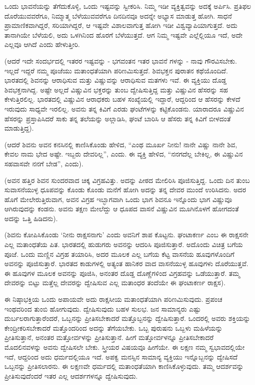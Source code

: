ಒಂದು ಭಾವನೆಯನ್ನು ತೆಗೆದುಕೊಳ್ಳಿ, ಒಂದು ಇಷ್ಟವನ್ನು ಸ್ವೀಕರಿಸಿ. ನಿಮ್ಮ ಇಡೀ ವ್ಯಕ್ತಿತ್ವವನ್ನು ಅದಕ್ಕೆ ಅರ್ಪಿಸಿ. ಪ್ರತಿಫಲ ದೊರೆಯುವವರೆಗೂ, ನಿಮ್ಮಾತ್ಮ ಬೆಳೆಯುವವರೆಗೂ ದಿನದಿನವೂ ಅದನ್ನೇ ಅಭ್ಯಾಸ ಮಾಡುತ್ತ ಹೋಗಿ. ಸಾಧನೆ ಪ್ರಾಮಾಣಿಕವಾಗಿದ್ದರೆ, ಸರಿಯಾಗಿದ್ದರೆ, ಆ ಇಷ್ಟವೇ ವಿಶಾಲವಾಗುತ್ತ ಹೋಗಿ ಇಡೀ ವಿಶ್ವವ್ಯಾಪಿಯಾಗುತ್ತದೆ. ಅದು ತಾನಾಗಿಯೇ ಬೆಳೆಯಲಿ, ಅದು ಒಳಗಿನಿಂದ ಹೊರಗೆ ಬೆಳೆಯುತ್ತದೆ. ಆಗ ನಿಮ್ಮ ಇಷ್ಟವೇ ಎಲ್ಲೆಲ್ಲಿಯೂ ಇದೆ, ಅದೇ ಎಲ್ಲವೂ ಆಗಿದೆ ಎಂದು ಹೇಳುತ್ತೀರಿ.

(ಆದರೆ ಇದೇ ಸಂದರ್ಭದಲ್ಲಿ ಇತರರ ಇಷ್ಟವನ್ನು - ಭಗವಂತನ ಇತರ ಭಾವನೆ ಗಳನ್ನು - ನಾವು ಗೌರವಿಸಬೇಕು. ಇಲ್ಲದೆ ಇದ್ದರೆ ನಮ್ಮ ಪೂಜೆಯು ಮತಾಂಧತೆಯಾಗಿ ಪರಿಣಮಿಸುತ್ತದೆ. ಶಿವಭಕ್ತನ ಪುರಾತನ ಕಥೆಯೊಂದಿದೆ. ಭಾರತದಲ್ಲಿ ಶಿವನನ್ನು ಆರಾಧಿಸುವ ಮತ್ತು ವಿಷ್ಣುವನ್ನು ಆರಾಧಿಸುವ ಮತಗಳು ಇವೆ. ಈ ವ್ಯಕ್ತಿಯು ದೊಡ್ಡ ಶಿವಭಕ್ತನಾಗಿದ್ದ. ಅಷ್ಟೇ ಅಲ್ಲದೆ ವಿಷ್ಣುವಿನ ಭಕ್ತರನ್ನು ತುಂಬ ದ್ವೇಷಿಸುತ್ತಿದ್ದ ಮತ್ತು ವಿಷ್ಣುವಿನ ಹೆಸರನ್ನು ಸಹ ಕೇಳುತ್ತಿರಲಿಲ್ಲ. ಭಾರತದಲ್ಲಿ ವಿಷ್ಣುವಿನ ಆರಾಧಕರು ಬಹಳ ಸಂಖ್ಯೆಯಲ್ಲಿ ಇದ್ದಾರೆ, ಆದ್ದರಿಂದ ಆ ಹೆಸರನ್ನು ಕೇಳದೆ ಇರುವುದು ಸಾಧ್ಯವೇ ಇರಲಿಲ್ಲ. ಅವನು ತನ್ನ ಕಿವಿಗೆ ಎರಡು ಘಂಟೆಗಳನ್ನು ಕಟ್ಟಿಕೊಂಡನು. ಯಾರಾದರೂ ವಿಷ್ಣುವಿನ ಹೆಸರನ್ನು ಪ್ರಸ್ತಾಪಿಸಿದರೆ ಸಾಕು ತನ್ನ ತಲೆಯನ್ನು ಅಲ್ಲಾಡಿಸಿ, ಘಂಟೆ ಬಾರಿಸಿ ಆ ಹೆಸರು ತನ್ನ ಕಿವಿಗೆ ಬೀಳದಂತೆ ಮಾಡುತ್ತಿದ್ದ).

(ಆದರೆ ಶಿವನು ಅವನ ಕನಸಿನಲ್ಲಿ ಕಾಣಿಸಿಕೊಂಡು ಹೇಳಿದ, “ಎಂಥ ಮೂರ್ಖ ನೀನು! ನಾನೇ ವಿಷ್ಣು ನಾನೇ ಶಿವ, ಕೇವಲ ನಾಮ ಭೇದ ಅಷ್ಟೇ. ಇಬ್ಬರು ದೇವರಿಲ್ಲ”, ಎಂದು. ಈ ವ್ಯಕ್ತಿ ಹೇಳಿದ, “ನನಗದೆಲ್ಲ ಬೇಕಿಲ್ಲ, ಈ ವಿಷ್ಣುವಿನ ಸಹವಾಸವೇ ನನಗೆ ಬೇಡ”, ಎಂದು).

(ಅವನ ಹತ್ತಿರ ಶಿವನ ಸುಂದರವಾದ ಚಿಕ್ಕ ವಿಗ್ರಹವಿತ್ತು. ಅದನ್ನು ಪೀಠದ ಮೇಲಿರಿಸಿ ಪೂಜಿಸುತ್ತಿದ್ದ. ಒಂದು ದಿನ ತುಂಬ ಸುವಾಸನೆಯುಳ್ಳ ಧೂಪವನ್ನು ಕೊಂಡು ಕೊಂಡು ಮನೆಗೆ ಹೋಗಿ ಅದನ್ನು ತನ್ನ ದೇವರ ಮುಂದೆ ಉರಿಸಿದನು. ಅದರ ಹೊಗೆ ಮೇಲೇರುತ್ತಿರುವಾಗ, ಅವನ ವಿಗ್ರಹ ಇಬ್ಭಾಗವಾಗಿ ಒಂದು ಭಾಗ ಶಿವನೂ ಇನ್ನೊಂದು ಭಾಗ ವಿಷ್ಣುವೂ ಆಗಿರುವುದನ್ನು ಕಂಡನು. ಅವನು ತಕ್ಷಣ ಮೇಲೆದ್ದು ಆ ಧೂಪದ ವಾಸನೆ ವಿಷ್ಣುವಿನ ಮೂಗಿನೊಳಗೆ ಹೋಗದಂತೆ ಅದನ್ನು ಒತ್ತಿ ಹಿಡಿದನು).

(ಶಿವನು ಕೋಪಿಸಿಕೊಂಡು ‘ನೀನು ರಾಕ್ಷಸನಾಗು’ ಎಂದು ಅವನಿಗೆ ಶಾಪ ಕೊಟ್ಟನು. ಘಂಟಾಕರ್ಣ ಎಂಬ ಈ ರಾಕ್ಷಸನೇ ಎಲ್ಲ ಮತಾಂಧತೆಯ ಪಿತ. ಭಾರತದಲ್ಲಿ ಹುಡುಗರು ಅವನನ್ನು ಆದರಿಸಿ ಪೂಜಿಸುತ್ತಾರೆ. ಅದೊಂದು ವಿಚಿತ್ರ ಬಗೆಯ ಪೂಜೆ. ಒಂದು ಮಣ್ಣಿನ ವಿಗ್ರಹ ತಯಾರಿಸಿ, ಅದರ ಮೂಲಕ ಎಲ್ಲ ಬಗೆಯ ಕೆಟ್ಟ ವಾಸನೆಯ ಹೂವುಗಳೊಂದಿಗೆ ಅವನನ್ನು ಪೂಜಿಸುತ್ತಾರೆ. ಭಾರತದ ಕಾಡುಗಳಲ್ಲಿ ಅತ್ಯಂತ ಹಾನಿಕರ ವಾದ ವಾಸನೆಯುಳ್ಳ ಹೂವುಗಳು ದೊರೆಯುತ್ತವೆ. ಈ ಹೂವುಗಳ ಮೂಲಕ ಅವನನ್ನು ಪೂಜಿಸಿ, ಅನಂತರ ದೊಡ್ಡ ದೊಣ್ಣೆಗಳಿಂದ ವಿಗ್ರಹವನ್ನು ಒಡೆಯುತ್ತಾರೆ. ತಮ್ಮ ದೇವರನ್ನು ಬಿಟ್ಟು ಮತ್ತೆಲ್ಲ ದೇವರನ್ನು ದ್ವೇಷಿಸುವ ಎಲ್ಲ ಮತಾಂಧರ ತಂದೆಯೇ ಈ ಘಂಟಾಕರ್ಣ ರಾಕ್ಷಸ).

ಈ ನಿಷ್ಠಾಭಕ್ತಿಯ ಒಂದು ಅಪಾಯವೇ ಅದು ರಾಕ್ಷಸೀಯ ಮತಾಂಧತೆಯಾಗಿ ಪರಿಣಮಿಸುವುದು. ಪ್ರಪಂಚ ಇಂಥವರಿಂದ ತುಂಬಿ ಹೋಗುವುದು. ದ್ವೇಷಿಸುವುದು ಬಹಳ ಸುಲಭ. ಜನ ಸಾಮಾನ್ಯರು ಎಷ್ಟು ದುರ್ಬಲರಾಗುತ್ತಾರೆಂದರೆ, ಒಬ್ಬನನ್ನು ಪ್ರೀತಿಸಬೇಕಾದರೆ ಮತ್ತೊಬ್ಬನನ್ನು ದ್ವೇಷಿಸುತ್ತಾರೆ. ಒಂದರಲ್ಲಿ ಅವರು ಶಕ್ತಿಯನ್ನು ಕೇಂದ್ರೀಕರಿಸಬೇಕಾದರೆ ಮತ್ತೊಂದರಿಂದ ಅದನ್ನು ತೆಗೆಯಬೇಕು. ಒಬ್ಬ ಪುರುಷನು ಒಬ್ಬಳು ಮಹಿಳೆಯನ್ನು ಪ್ರೀತಿಸುತ್ತಾನೆ, ಅನಂತರ ಮತ್ತೋರ್ವಳನ್ನು ಪ್ರೀತಿಸುತ್ತಾನೆ. ಹೀಗೆ ಮತ್ತೋರ್ವಳನ್ನೂ ಪ್ರೀತಿಸಬೇಕಾದರೆ ಮೊದಲಿನವಳನ್ನು ಅವನು ದ್ವೇಷಿಸಲೇ ಬೇಕು. ಸ್ತ್ರೀಯರ ವಿಷಯವೂ ಹೀಗೆಯೇ. ಈ ಲಕ್ಷಣ ನಮ್ಮ ಸ್ವಭಾವದಲ್ಲಿಯೇ ಇದೆ, ಆದ್ದರಿಂದ ಅದು ಧರ್ಮದಲ್ಲಿಯೂ ಇದೆ. ಅಪಕ್ವ ಮನಸ್ಸಿನ ಸಾಮಾನ್ಯ ವ್ಯಕ್ತಿಯು ಇನ್ನೊಬ್ಬನನ್ನು ದ್ವೇಷಿಸದೆ ಒಬ್ಬನನ್ನು ಪ್ರೀತಿಸಲಾರನು. ಈ ಲಕ್ಷಣವೇ ಧರ್ಮದಲ್ಲಿ ಮತಾಂಧತೆಯಾಗಿ ಕಾಣಿಸಿಕೊಳ್ಳುವುದು. ತಮ್ಮ ಆದರ್ಶವನ್ನು ಪ್ರೀತಿಸುವುದೆಂದರೆ ಇತರ ಎಲ್ಲ ಆದರ್ಶಗಳನ್ನೂ ದ್ವೇಷಿಸುವುದು.


